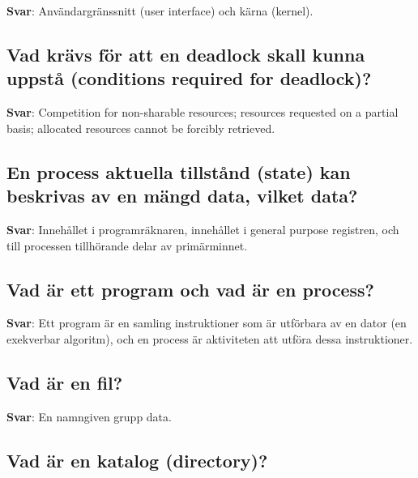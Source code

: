 \documentclass[a4paper,11pt,oneside]{article}
\begin{document}
\begin{sloppypar}
\textbf{Svar}: Anv\"andargr\"anssnitt (user interface) och k\"arna (kernel).



\subsection{Vad kr\"avs f\"or att en deadlock skall kunna uppst\r{a} (conditions required for deadlock)?}

\label{q:119:sa:sv:True}

\textbf{Svar}: Competition for non-sharable resources; resources requested on a partial basis; allocated resources cannot be forcibly retrieved.



\subsection{En process aktuella tillst\r{a}nd (state) kan beskrivas av en m\"angd data, vilket data?}

\label{q:120:sa:sv:True}

\textbf{Svar}: Inneh\r{a}llet i programr\"aknaren, inneh\r{a}llet i general purpose registren, och till processen tillh\"orande delar av prim\"arminnet.



\subsection{Vad \"ar ett program och vad \"ar en process?}

\label{q:121:sa:sv:True}

\textbf{Svar}: Ett program \"ar en samling instruktioner som \"ar utf\"orbara av en dator (en exekverbar algoritm), och en process \"ar aktiviteten att utf\"ora dessa instruktioner.



\subsection{Vad \"ar en fil?}

\label{q:122:sa:sv:True}

\textbf{Svar}: En namngiven grupp data.



\subsection{Vad \"ar en katalog (directory)?}


\end{sloppypar}
\end{document}
